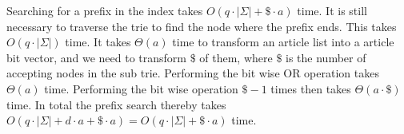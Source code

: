 Searching for a prefix in the index takes $O(q\cdot |\Sigma| + \$ \cdot a)$ time. It is still necessary to traverse the trie to find the node where the prefix ends. This takes $O(q\cdot |\Sigma|)$ time. It takes $\Theta(a)$ time to transform an article list into a article bit vector, and we need to transform $\$$ of them, where $\$$ is the number of accepting nodes in the sub trie. Performing the bit wise OR operation takes $\Theta(a)$ time. Performing the bit wise operation $\$-1$ times then takes $\Theta(a \cdot \$)$ time. In total the prefix search thereby takes $O(q\cdot |\Sigma| + d\cdot a + \$\cdot a) = O(q\cdot |\Sigma| + \$\cdot a)$ time. 

 

